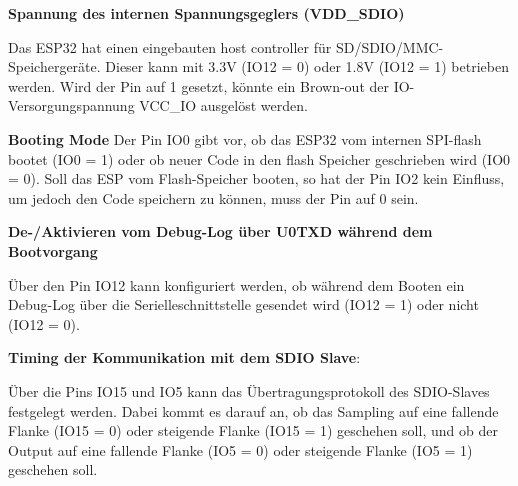 

\textbf{Spannung des internen Spannungsgeglers (VDD\_SDIO)}

Das ESP32 hat einen eingebauten host controller für SD/SDIO/MMC-Speichergeräte. Dieser kann mit 3.3V (IO12 = 0) oder 1.8V (IO12 = 1) betrieben werden. Wird der Pin auf 1 gesetzt, könnte ein Brown-out der IO-Versorgungspannung VCC\_IO ausgelöst werden.

\textbf{Booting Mode}
Der Pin IO0 gibt vor, ob das ESP32 vom internen SPI-flash bootet (IO0 = 1) oder ob neuer Code in den flash Speicher geschrieben wird (IO0 = 0). Soll das ESP vom Flash-Speicher booten, so hat der Pin IO2 kein Einfluss, um jedoch den Code speichern zu können, muss der Pin auf 0 sein.

\textbf{De-/Aktivieren vom Debug-Log über U0TXD während dem Bootvorgang}

Über den Pin IO12 kann konfiguriert werden, ob während dem Booten ein Debug-Log über die Serielleschnittstelle gesendet wird (IO12 = 1) oder nicht (IO12 = 0). 

\textbf{Timing der Kommunikation mit dem SDIO Slave}:

Über die Pins IO15 und IO5 kann das Übertragungsprotokoll des SDIO-Slaves festgelegt werden. Dabei kommt es darauf an, ob das Sampling auf eine fallende Flanke (IO15 = 0) oder steigende Flanke (IO15 = 1) geschehen soll, und ob der Output auf eine fallende Flanke (IO5 = 0) oder steigende Flanke (IO5 = 1) geschehen soll.

\newpage

%
